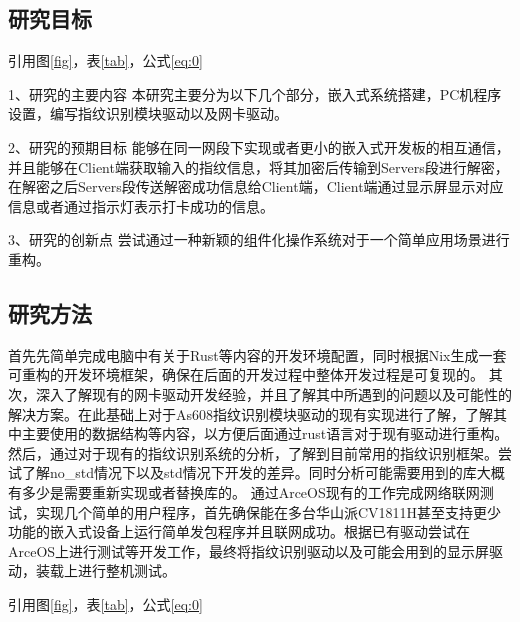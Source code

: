 \subsection{研究目标}
引用图\ref{fig}，表\ref{tab}，公式\eqref{eq:0}

1、研究的主要内容
本研究主要分为以下几个部分，嵌入式系统搭建，PC机程序设置，编写指纹识别模块驱动以及网卡驱动。

2、研究的预期目标
能够在同一网段下实现或者更小的嵌入式开发板的相互通信，并且能够在Client端获取输入的指纹信息，将其加密后传输到Servers段进行解密，在解密之后Servers段传送解密成功信息给Client端，Client端通过显示屏显示对应信息或者通过指示灯表示打卡成功的信息。

3、研究的创新点
    尝试通过一种新颖的组件化操作系统对于一个简单应用场景进行重构。

\subsection{研究方法}

首先先简单完成电脑中有关于Rust等内容的开发环境配置，同时根据Nix生成一套可重构的开发环境框架，确保在后面的开发过程中整体开发过程是可复现的。
其次，深入了解现有的网卡驱动开发经验，并且了解其中所遇到的问题以及可能性的解决方案。在此基础上对于As608指纹识别模块驱动的现有实现进行了解，了解其中主要使用的数据结构等内容，以方便后面通过rust语言对于现有驱动进行重构。
然后，通过对于现有的指纹识别系统的分析，了解到目前常用的指纹识别框架。尝试了解no\_std情况下以及std情况下开发的差异。同时分析可能需要用到的库大概有多少是需要重新实现或者替换库的。
通过ArceOS现有的工作完成网络联网测试，实现几个简单的用户程序，首先确保能在多台华山派CV1811H甚至支持更少功能的嵌入式设备上运行简单发包程序并且联网成功。根据已有驱动尝试在ArceOS上进行测试等开发工作，最终将指纹识别驱动以及可能会用到的显示屏驱动，装载上进行整机测试。

引用图\ref{fig}，表\ref{tab}，公式\eqref{eq:0}